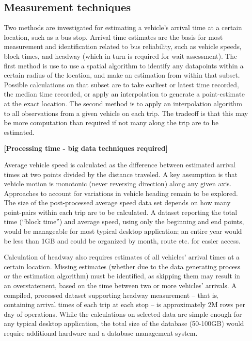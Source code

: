 \documentclass[12pt]{report}
\begin{document}
\subsection{Measurement techniques}

Two methods are investigated for estimating a vehicle's arrival time at a certain location, such as a bus stop.  Arrival time estimates are the basis for most measurement and identification related to bus reliability, such as vehicle speeds, block times, and headway (which in turn is required for wait assessment).  The first method is use to use a spatial algorithm to identify any datapoints within a certain radius of the location, and make an estimation from within that subset.  Possible calculations on that subset are to take earliest or latest time recorded, the median time recorded, or apply an interpolation to generate a point-estimate at the exact location.  The second method is to apply an interpolation algorithm to all observations from a given vehicle on each trip.  The tradeoff is that this may be more computation than required if not many along the trip are to be estimated.

\textbf{[Processing time - big data techniques required]}


Average vehicle speed is calculated as the difference between estimated arrival times at two points divided by the distance traveled.  A key assumption is that vehicle motion is monotonic (never reversing direction) along any given axis.  Approaches to account for variations in vehicle heading remain to be explored.  The size of the post-processed average speed data set depends on how many point-pairs within each trip are to be calculated.  A dataset reporting the total time (“block time'') and average speed, using only the beginning and end points, would be manageable for most typical desktop application; an entire year would be less than 1GB and could be organized by month, route etc. for easier access.

Calculation of headway also requires estimates of all vehicles' arrival times at a certain location.  Missing estimates (whether due to the data generating process or the estimation algorithm) must be identified, as skipping them may result in an overstatement, based on the time between two or more vehicles' arrivals.  A compiled, processed dataset supporting headway measurement -- that is, containing arrival times of each trip at each stop -- is approximately 2M rows per day of operations.  While the calculations on selected data are simple enough for any typical desktop application, the total size of the database (50-100GB) would require additional hardware and a database management system.
\end{document}
